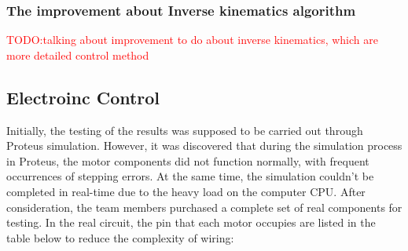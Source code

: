\subsubsection{The improvement about Inverse kinematics algorithm}
\textcolor{red}{TODO:talking about improvement to do about inverse kinematics, which are more detailed control method}

\subsection{Electroinc Control}
Initially, the testing of the results was supposed to be carried out through Proteus simulation. However, 
it was discovered that during the simulation process in Proteus, the motor components did not function normally, 
with frequent occurrences of stepping errors. At the same time, the simulation couldn't be completed in real-time 
due to the heavy load on the computer CPU. After consideration, the team members purchased a complete set of real 
components for testing. In the real circuit, the pin that each motor occupies are listed in the table below to 
reduce the complexity of wiring: \\


